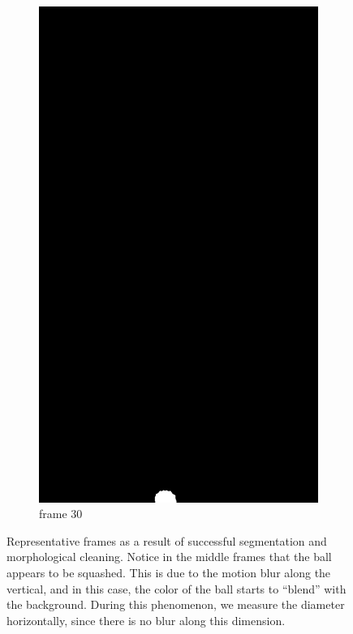 \documentclass[12pt,a4paper]{article}
\begin{document}
\begin{figure}[htb]
\begin{subfigure}[h!]{0.3\textwidth}
		\includegraphics[width=\textwidth]{7296/29.png}
		\caption{frame 30}
	\end{subfigure}
	\caption{Representative frames as a result of successful segmentation and morphological cleaning. Notice in the middle frames that the ball appears to be squashed. This is due to the motion blur along the vertical, and in this case, the color of the ball starts to ``blend'' with the background. During this phenomenon, we measure the diameter horizontally, since there is no blur along this dimension.}
	\label{fig:segment}
\end{figure}
\end{document}
